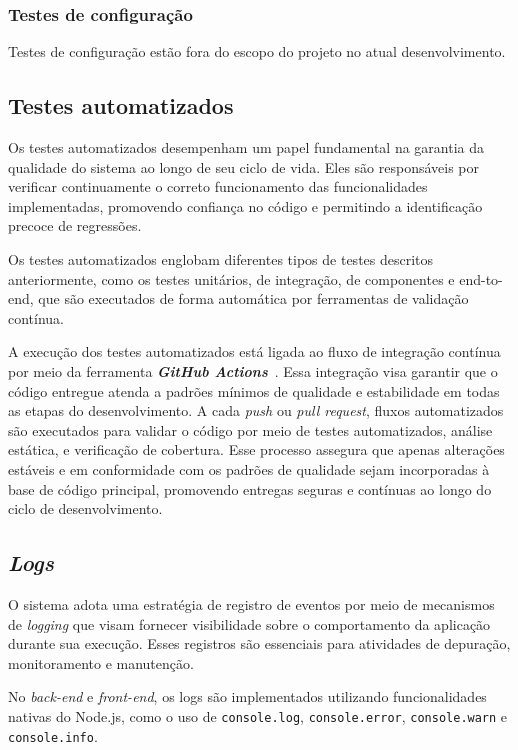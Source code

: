 \subsubsection{Testes de configuração}
Testes de configuração estão fora do escopo do projeto no atual desenvolvimento.

\subsection{Testes automatizados}
Os testes automatizados desempenham um papel fundamental na garantia da qualidade do sistema ao longo de seu ciclo de vida. Eles são responsáveis por verificar continuamente o correto funcionamento das funcionalidades implementadas, promovendo confiança no código e permitindo a identificação precoce de regressões.

Os testes automatizados englobam diferentes tipos de testes descritos anteriormente, como os testes unitários, de integração, de componentes e end-to-end, que são executados de forma automática por ferramentas de validação contínua.

A execução dos testes automatizados está ligada ao fluxo de integração contínua por meio da ferramenta \textbf{\textit{GitHub Actions}}~\cite{githubactions-2025}. Essa integração visa garantir que o código entregue atenda a padrões mínimos de qualidade e estabilidade em todas as etapas do desenvolvimento.  A cada \textit{push} ou \textit{pull request}, fluxos automatizados são executados para validar o código por meio de testes automatizados, análise estática, e verificação de cobertura. Esse processo assegura que apenas alterações estáveis e em conformidade com os padrões de qualidade sejam incorporadas à base de código principal, promovendo entregas seguras e contínuas ao longo do ciclo de desenvolvimento.

\subsection{\textit{Logs}}
O sistema adota uma estratégia de registro de eventos por meio de mecanismos de \textit{logging} que visam fornecer visibilidade sobre o comportamento da aplicação durante sua execução. Esses registros são essenciais para atividades de depuração, monitoramento e manutenção.

No \textit{back-end} e \textit{front-end}, os logs são implementados utilizando funcionalidades nativas do Node.js, como o uso de \texttt{console.log}, \texttt{console.error}, \texttt{console.warn} e \texttt{console.info}.

